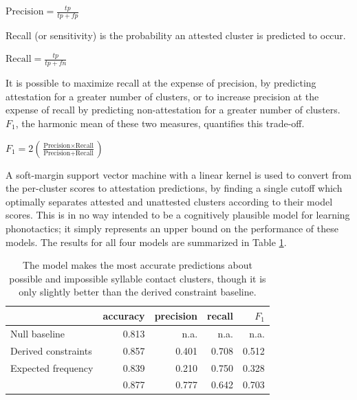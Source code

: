 \begin{unlabeledexample}
$\displaystyle \textrm{Precision} = \frac{tp}{tp + fp}$
\end{unlabeledexample}

\noindent Recall (or sensitivity) is the probability an attested cluster is predicted to occur.

\begin{unlabeledexample}
$\displaystyle \textrm{Recall} = \frac{tp}{tp + fn}$
\end{unlabeledexample}

\noindent It is possible to maximize recall at the expense of precision, by predicting attestation for a greater number of clusters, or to increase precision at the expense of recall by predicting non-attestation for a greater number of clusters. $F_1$, the harmonic mean of these two measures, quantifies this trade-off.

\begin{unlabeledexample}
$\displaystyle F_1 = 2 \left( \frac{\textrm{Precision} \times \textrm{Recall}}{\textrm{Precision} + \textrm{Recall}}\right)$
\end{unlabeledexample}

A soft-margin support vector machine \citep{Cortes1995} with a linear kernel is used to convert from the per-cluster scores to attestation predictions, by finding a single cutoff which optimally separates attested and unattested clusters according to their model scores. This is in no way intended to be a cognitively plausible model for learning phonotactics; it simply represents an upper bound on the performance of these models. The results for all four models are summarized in Table \ref{cmresults}.

\begin{table} \centering
\begin{tabular}{l | r r r r}
\toprule
                          & accuracy & precision & recall & $F_1$ \\
\midrule
Null baseline             & 0.813    & n.a.      & n.a.   & n.a.  \\
Derived constraints       & 0.857    & 0.401     & 0.708  & 0.512 \\
Expected frequency        & 0.839    & 0.210     & 0.750  & 0.328 \\
\citet{Hayes2008a}        & 0.877    & 0.777     & 0.642  & 0.703 \\
\bottomrule
\end{tabular}
\caption{The \citeauthor{Hayes2008a} model makes the most accurate predictions about possible and impossible syllable contact clusters, though it is only slightly better than the derived constraint baseline.}
\label{cmresults}
\end{table}

